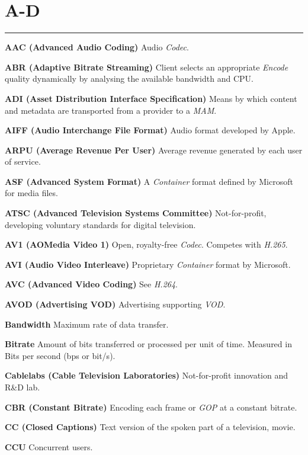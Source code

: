\section{A-D}
\hrule

\medskip
\textbf{AAC (Advanced Audio Coding)}
Audio \textit{Codec}.

\smallskip
\textbf{ABR (Adaptive Bitrate Streaming)}
Client selects an appropriate \textit{Encode} quality dynamically by analysing the available bandwidth and CPU.

\smallskip
\textbf{ADI (Asset Distribution Interface Specification)}
Means by which content and metadata are transported from a provider to a \textit{MAM}.

\smallskip
\textbf{AIFF (Audio Interchange File Format)}
Audio format developed by Apple.

\smallskip
\textbf{ARPU (Average Revenue Per User)}
Average revenue generated by each user of service.

\smallskip
\textbf{ASF (Advanced System Format)}
A \textit{Container} format defined by Microsoft for media files.

\smallskip
\textbf{ATSC (Advanced Television Systems Committee)}
Not-for-profit, developing voluntary standards for digital television.

\smallskip
\textbf{AV1 (AOMedia Video 1)}
Open, royalty-free \textit{Codec}. Competes with \textit{H.265}.

\smallskip
\textbf{AVI (Audio Video Interleave)}
Proprietary \textit{Container} format by Microsoft.

\smallskip
\textbf{AVC (Advanced Video Coding)}
See \textit{H.264}.

\smallskip
\textbf{AVOD (Advertising VOD)}
Advertising supporting \textit{VOD}.

\smallskip
\textbf{Bandwidth}
Maximum rate of data transfer.

\smallskip
\textbf{Bitrate}
Amount of bits transferred or processed per unit of time.  Measured in Bits per second (bps or bit/s).

\smallskip
\textbf{Cablelabs (Cable Television Laboratories)}
Not-for-profit innovation and R\&D lab.

\smallskip
\textbf{CBR (Constant Bitrate)}
Encoding each frame or \textit{GOP} at a constant bitrate.

\smallskip
\textbf{CC (Closed Captions)}
Text version of the spoken part of a television, movie.

\smallskip
\textbf{CCU}
Concurrent users.

